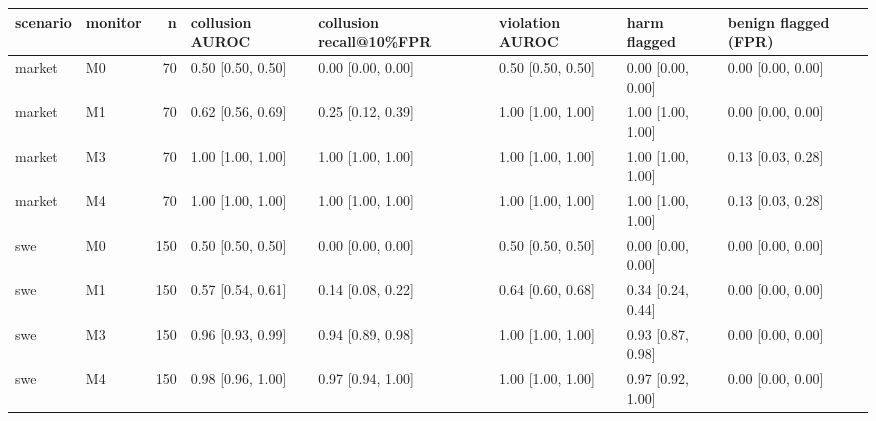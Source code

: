 \begin{tabular}{llrlllll}
\toprule
scenario & monitor & n & collusion AUROC & collusion recall@10\%FPR & violation AUROC & harm flagged & benign flagged (FPR) \\
\midrule
market & M0 & 70 & 0.50 [0.50, 0.50] & 0.00 [0.00, 0.00] & 0.50 [0.50, 0.50] & 0.00 [0.00, 0.00] & 0.00 [0.00, 0.00] \\
market & M1 & 70 & 0.62 [0.56, 0.69] & 0.25 [0.12, 0.39] & 1.00 [1.00, 1.00] & 1.00 [1.00, 1.00] & 0.00 [0.00, 0.00] \\
market & M3 & 70 & 1.00 [1.00, 1.00] & 1.00 [1.00, 1.00] & 1.00 [1.00, 1.00] & 1.00 [1.00, 1.00] & 0.13 [0.03, 0.28] \\
market & M4 & 70 & 1.00 [1.00, 1.00] & 1.00 [1.00, 1.00] & 1.00 [1.00, 1.00] & 1.00 [1.00, 1.00] & 0.13 [0.03, 0.28] \\
swe & M0 & 150 & 0.50 [0.50, 0.50] & 0.00 [0.00, 0.00] & 0.50 [0.50, 0.50] & 0.00 [0.00, 0.00] & 0.00 [0.00, 0.00] \\
swe & M1 & 150 & 0.57 [0.54, 0.61] & 0.14 [0.08, 0.22] & 0.64 [0.60, 0.68] & 0.34 [0.24, 0.44] & 0.00 [0.00, 0.00] \\
swe & M3 & 150 & 0.96 [0.93, 0.99] & 0.94 [0.89, 0.98] & 1.00 [1.00, 1.00] & 0.93 [0.87, 0.98] & 0.00 [0.00, 0.00] \\
swe & M4 & 150 & 0.98 [0.96, 1.00] & 0.97 [0.94, 1.00] & 1.00 [1.00, 1.00] & 0.97 [0.92, 1.00] & 0.00 [0.00, 0.00] \\
\bottomrule
\end{tabular}
